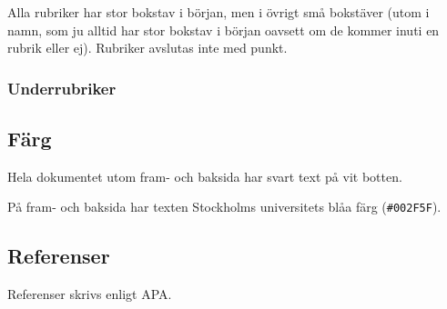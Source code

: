 Alla rubriker har stor bokstav i början, men i övrigt små bokstäver (utom i
namn, som ju alltid har stor bokstav i början oavsett om de kommer inuti en
rubrik eller ej). Rubriker avslutas inte med punkt.


\subsubsection{Underrubriker}


\subsection{Färg}

Hela dokumentet utom fram- och baksida har svart text på vit botten.

På fram- och baksida har texten Stockholms universitets blåa färg
(\texttt{\#002F5F}).


\subsection{Referenser}

Referenser skrivs enligt APA.

